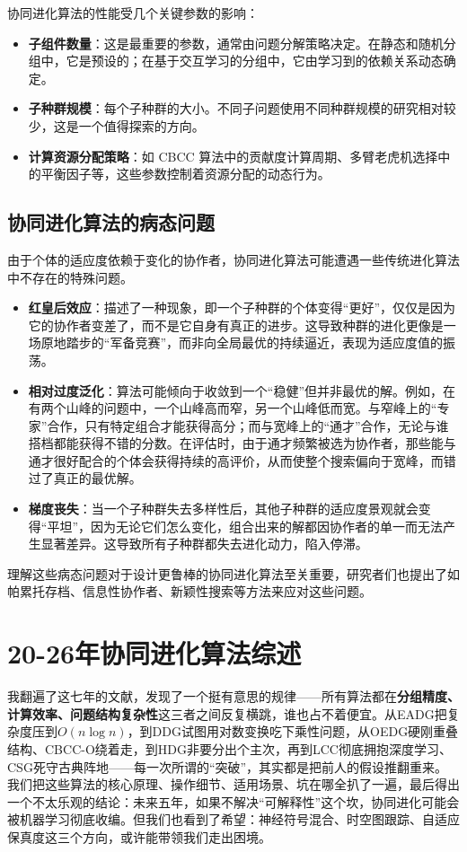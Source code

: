 \begin{itemize}
    协同进化算法的性能受几个关键参数的影响：
    \begin{itemize}
        \item \textbf{子组件数量}：这是最重要的参数，通常由问题分解策略决定。在静态和随机分组中，它是预设的；在基于交互学习的分组中，它由学习到的依赖关系动态确定。
        \item \textbf{子种群规模}：每个子种群的大小。不同子问题使用不同种群规模的研究相对较少，这是一个值得探索的方向。
        \item \textbf{计算资源分配策略}：如 CBCC 算法中的贡献度计算周期、多臂老虎机选择中的平衡因子等，这些参数控制着资源分配的动态行为。
    \end{itemize}
\end{itemize}

\subsection{协同进化算法的病态问题}

由于个体的适应度依赖于变化的协作者，协同进化算法可能遭遇一些传统进化算法中不存在的特殊问题。

\begin{itemize}
    \item \textbf{红皇后效应}：描述了一种现象，即一个子种群的个体变得“更好”，仅仅是因为它的协作者变差了，而不是它自身有真正的进步。这导致种群的进化更像是一场原地踏步的“军备竞赛”，而非向全局最优的持续逼近，表现为适应度值的振荡。
    \item \textbf{相对过度泛化}：算法可能倾向于收敛到一个“稳健”但并非最优的解。例如，在有两个山峰的问题中，一个山峰高而窄，另一个山峰低而宽。与窄峰上的“专家”合作，只有特定组合才能获得高分；而与宽峰上的“通才”合作，无论与谁搭档都能获得不错的分数。在评估时，由于通才频繁被选为协作者，那些能与通才很好配合的个体会获得持续的高评价，从而使整个搜索偏向于宽峰，而错过了真正的最优解。
    \item \textbf{梯度丧失}：当一个子种群失去多样性后，其他子种群的适应度景观就会变得“平坦”，因为无论它们怎么变化，组合出来的解都因协作者的单一而无法产生显著差异。这导致所有子种群都失去进化动力，陷入停滞。
\end{itemize}

理解这些病态问题对于设计更鲁棒的协同进化算法至关重要，研究者们也提出了如帕累托存档、信息性协作者、新颖性搜索等方法来应对这些问题。

\section{20-26年协同进化算法综述}
我翻遍了这七年的文献，发现了一个挺有意思的规律——所有算法都在\textbf{分组精度、计算效率、问题结构复杂性}这三者之间反复横跳，谁也占不着便宜。从EADG把复杂度压到$O(n \log n)$，到DDG试图用对数变换吃下乘性问题，从OEDG硬刚重叠结构、CBCC-O绕着走，到HDG非要分出个主次，再到LCC彻底拥抱深度学习、CSG死守古典阵地——每一次所谓的“突破”，其实都是把前人的假设推翻重来。我们把这些算法的核心原理、操作细节、适用场景、坑在哪全扒了一遍，最后得出一个不太乐观的结论：未来五年，如果不解决“可解释性”这个坎，协同进化可能会被机器学习彻底收编。但我们也看到了希望：神经符号混合、时空图跟踪、自适应保真度这三个方向，或许能带领我们走出困境。

